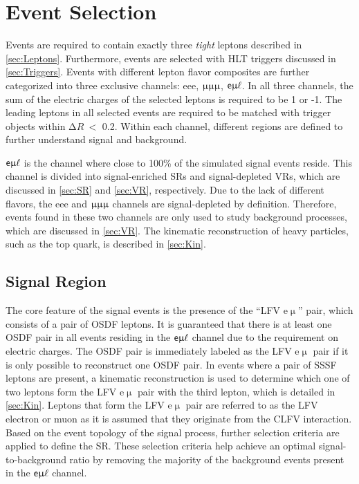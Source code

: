 \chapter{Event Selection}
\label{chap:Selection}

Events are required to contain exactly three \emph{tight} leptons described in \autoref{sec:Leptons}. Furthermore, events are selected with \ac{HLT} triggers discussed in \autoref{sec:Triggers}. Events with different lepton flavor composites are further categorized into three exclusive channels: eee, $\upmu\upmu\upmu$, $\textsf{e}\upmu\ell$. In all three channels, the sum of the electric charges of the selected leptons is required to be 1 or -1. The leading leptons in all selected events are required to be matched with trigger objects within $\mathrm{\Delta} R~<$ 0.2. Within each channel, different regions are defined to further understand signal and background.

$\textsf{e}\upmu\ell$ is the channel where close to 100\% of the simulated signal events reside. This channel is divided into signal-enriched \acp{SR} and signal-depleted \acp{VR}, which are discussed in \autoref{sec:SR} and \autoref{sec:VR}, respectively. Due to the lack of different flavors, the eee and $\upmu\upmu\upmu$ channels are signal-depleted by definition. Therefore, events found in these two channels are only used to study background processes, which are discussed in \autoref{sec:VR}. The kinematic reconstruction of heavy particles, such as the top quark, is described in \autoref{sec:Kin}.
\section{Signal Region}
\label{sec:SR}

The core feature of the signal events is the presence of the ``LFV e$\upmu$'' pair, which consists of a pair of \ac{OSDF} leptons. It is guaranteed that there is at least one \ac{OSDF} pair in all events residing in the $\textsf{e}\upmu\ell$ channel due to the requirement on electric charges. The \ac{OSDF} pair is immediately labeled as the LFV e$\upmu$ pair if it is only possible to reconstruct one \ac{OSDF} pair. In events where a pair of \ac{SSSF} leptons are present, a kinematic reconstruction is used to determine which one of two leptons form the LFV e$\upmu$ pair with the third lepton, which is detailed in \autoref{sec:Kin}. Leptons that form the LFV e$\upmu$ pair are referred to as the LFV electron or muon as it is assumed that they originate from the \ac{CLFV} interaction. Based on the event topology of the signal process, further selection criteria are applied to define the \ac{SR}. These selection criteria help achieve an optimal signal-to-background ratio by removing the majority of the background events present in the $\textsf{e}\upmu\ell$ channel. 

